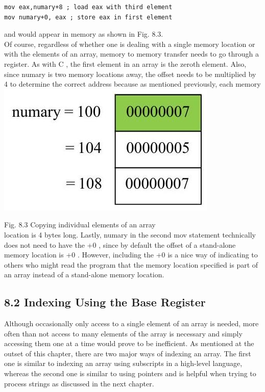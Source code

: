 \documentclass[10pt]{article}
\begin{document}
\begin{verbatim}
mov eax,numary+8 ; load eax with third element
mov numary+0, eax ; store eax in first element
\end{verbatim}

and would appear in memory as shown in Fig. 8.3.\\
Of course, regardless of whether one is dealing with a single memory location or with the elements of an array, memory to memory transfer needs to go through a register. As with C , the first element in an array is the zeroth element. Also, since numary is two memory locations away, the offset needs to be multiplied by 4 to determine the correct address because as mentioned previously, each memory\\
\includegraphics[max width=\textwidth, center]{2025_03_24_ebe50cc223a6fbc49eecg-174}

Fig. 8.3 Copying individual elements of an array\\
location is 4 bytes long. Lastly, numary in the second mov statement technically does not need to have the +0 , since by default the offset of a stand-alone memory location is +0 . However, including the +0 is a nice way of indicating to others who might read the program that the memory location specified is part of an array instead of a stand-alone memory location.

\subsection*{8.2 Indexing Using the Base Register}
Although occasionally only access to a single element of an array is needed, more often than not access to many elements of the array is necessary and simply accessing them one at a time would prove to be inefficient. As mentioned at the outset of this chapter, there are two major ways of indexing an array. The first one is similar to indexing an array using subscripts in a high-level language, whereas the second one is similar to using pointers and is helpful when trying to process strings as discussed in the next chapter.
\end{document}
